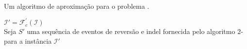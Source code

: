 \begin{algorithm}[!tbh]
  \caption{Um algoritmo de aproximação para o problema \SbFIRI{}.\label{algorithm:ZCBCGAUW}}
  $\mathcal{I}' = \mathcal{F}_{c}^{'}(\mathcal{I})$ \\
  Seja $S'$ uma sequência de eventos de reversão e indel fornecida pelo algoritmo $2$-\SbIRI{} para a instância $\mathcal{I}'$ \\
\end{algorithm}